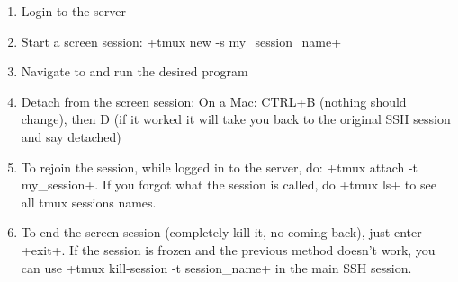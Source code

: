 \documentclass{article}
\let\verb\relax
\newcommand{\verb}{\collectverb{\color{codefg}\ttfamily\colorbox{codebg}}}
\begin{document}
\begin{enumerate}
    \item Login to the server
    \item Start a screen session: \verb+tmux new -s my_session_name+
    \item Navigate to and run the desired program
    \item Detach from the screen session: On a Mac: CTRL+B (nothing should change), then D (if it worked it will take you back to the original SSH session and say detached)
    \item To rejoin the session, while logged in to the server, do: \verb+tmux attach -t my_session+. If you forgot what the session is called, do \verb+tmux ls+ to see all tmux sessions names. 
    \item To end the screen session (completely kill it, no coming back), just enter \verb+exit+. If the session is frozen and the previous method doesn't work, you can use \verb+tmux kill-session -t session_name+ in the main SSH session.
\end{enumerate}
\end{document}
